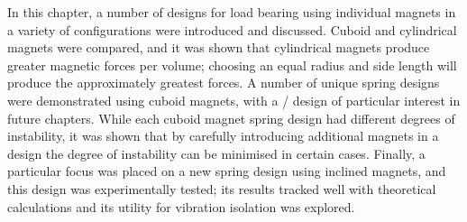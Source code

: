 \documentclass[11pt,a4paper]{memoir}
\begin{document}
In this chapter, a number of designs for load bearing using individual magnets in a variety of configurations were introduced and discussed.
Cuboid and cylindrical magnets were compared, and it was shown that cylindrical magnets produce greater magnetic forces per volume; choosing an equal radius and side length will produce the approximately greatest forces.
A number of unique spring designs were demonstrated using cuboid magnets, with a \qzs/ design of particular interest in future chapters.
While each cuboid magnet spring design had different degrees of instability, it was shown that by carefully introducing additional magnets in a design the degree of instability can be minimised in certain cases.
Finally, a particular focus was placed on a new spring design using inclined magnets, and this design was experimentally tested; its results tracked well with theoretical calculations and its utility for vibration isolation was explored.
\end{document}
